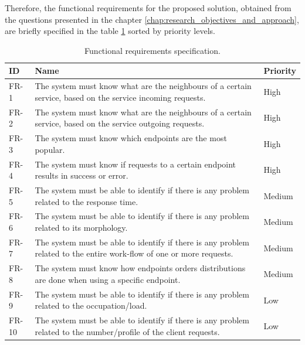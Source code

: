 Therefore, the functional requirements for the proposed solution, obtained from the questions presented in the chapter \ref{chap:research_objectives_and_approach}, are briefly specified in the table \ref{table:functional_requirements_specification} sorted by priority levels.

\begin{table}[!ht]
\caption{Functional requirements specification.}
\label{table:functional_requirements_specification}
\begin{tabularx}{\linewidth} {
    |>{\hsize=0.4\hsize}X| 
     >{\hsize=2.2\hsize}X|
     >{\hsize=0.4\hsize}X| }
    \hline
    \textbf{ID} 
    & \textbf{Name}
    & \textbf{Priority} \\ \hline
    FR-1
    & The system must know what are the neighbours of a certain service, based on the service incoming requests.
    & High \\ \hline
    FR-2
    & The system must know what are the neighbours of a certain service, based on the service outgoing requests.
    & High \\ \hline
    FR-3
    & The system must know which endpoints are the most popular.
    & High \\ \hline
    FR-4
    & The system must know if requests to a certain endpoint results in success or error.
    & High \\ \hline
    FR-5
    & The system must be able to identify if there is any problem related to the response time.
    & Medium \\ \hline
    FR-6
    & The system must be able to identify if there is any problem related to its morphology.
    & Medium \\ \hline
    FR-7
    & The system must be able to identify if there is any problem related to the entire work-flow of one or more requests.
    & Medium \\ \hline
    FR-8
    & The system must know how endpoints orders distributions are done when using a specific endpoint.
    & Medium \\ \hline
    FR-9
    & The system must be able to identify if there is any problem related to the occupation/load.
    & Low \\ \hline
    FR-10
    & The system must be able to identify if there is any problem related to the number/profile of the client requests.
    & Low \\ \hline
\end{tabularx}
\end{table}

